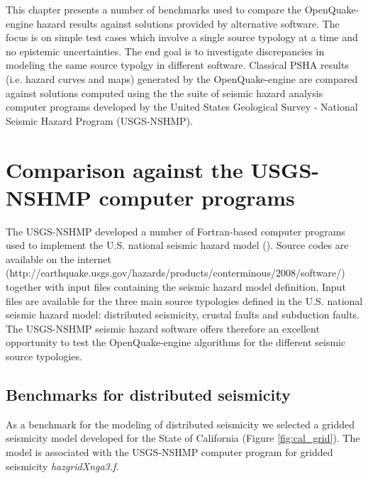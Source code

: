 This chapter presents a number of benchmarks used to compare the OpenQuake-engine
hazard results against solutions provided by alternative software. The focus is on simple test cases which involve a single source typology at a time and no epistemic uncertainties. The end goal is to investigate discrepancies in modeling the same source typolgy in different software. Classical PSHA results (i.e. hazard curves and maps) generated by the OpenQuake-engine are compared against solutions computed using the the suite of seismic hazard analysis computer programs developed by the United States Geological Survey - National Seismic Hazard Program (USGS-NSHMP).
\section{Comparison against the USGS-NSHMP computer programs}
The USGS-NSHMP developed a number of Fortran-based computer programs used to implement the U.S. national seismic hazard model (\cite{petersen2008}). Source codes are available on the internet (http://earthquake.usgs.gov/hazards/products/conterminous/2008/software/) together with input files containing the seismic hazard model definition. Input files are available for the three main source typologies
defined in the U.S. national seismic hazard model: distributed seismicity, crustal faults and subduction faults.
The USGS-NSHMP seismic hazard software offers therefore an excellent opportunity to test the OpenQuake-engine algorithms for the different seismic source typologies.

\subsection{Benchmarks for distributed seismicity}
As a benchmark for the modeling of distributed seismicity we selected a gridded seismicity model developed for the State of California (Figure \ref{fig:cal_grid}). The model is associated with the USGS-NSHMP computer program for gridded seismicity \textit{hazgridXnga3.f}. 

